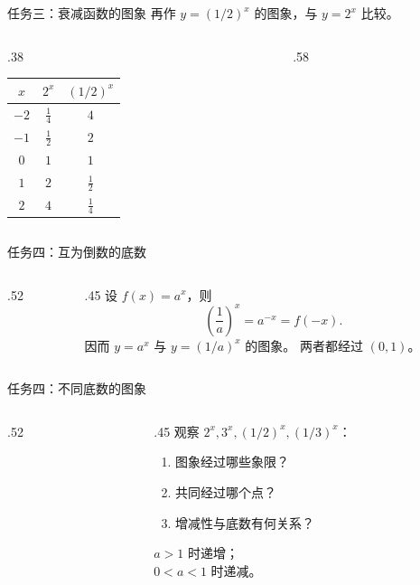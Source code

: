\documentclass[aspectratio=169,10pt]{beamer}
\begin{document}
\begin{frame}[t]{任务三：衰减函数的图象}
 再作 $y=(1/2)^x$ 的图象，与 $y=2^x$ 比较。
 \begin{columns}[T,onlytextwidth]
  \begin{column}{.38\textwidth}
   \centering\normalsize\renewcommand{\arraystretch}{1.55}
   \begin{tabular}{c|c|c}
    $x$ & $2^x$ & $(1/2)^x$\\\hline
    $-2$ & $\frac14$ & $4$\\$-1$ & $\frac12$ & $2$\\
    $0$ & $1$ & $1$\\$1$ & $2$ & $\frac12$\\$2$ & $4$ & $\frac14$
   \end{tabular}
  \end{column}
  \begin{column}{.58\textwidth}\centering\expplot\end{column}
 \end{columns}
\end{frame}

\begin{frame}[t]{任务四：互为倒数的底数}
 \begin{columns}[T,onlytextwidth]
  \begin{column}{.52\textwidth}\centering\expplot\end{column}
  \begin{column}{.45\textwidth}
   设 $f(x)=a^x$，则
   \[\left(\frac1a\right)^x=a^{-x}=f(-x).\]
   \pause
   因而 $y=a^x$ 与 $y=(1/a)^x$ 的图象。
   \gap
   两者都经过 $(0,1)$。
  \end{column}
 \end{columns}
\end{frame}

\begin{frame}[t]{任务四：不同底数的图象}
 \begin{columns}[T,onlytextwidth]
  \begin{column}{.52\textwidth}\centering\expplot[4]\end{column}
  \begin{column}{.45\textwidth}
   观察 $2^x,3^x,(1/2)^x,(1/3)^x$：
   \begin{enumerate}
    \item 图象经过哪些象限？
    \item 共同经过哪个点？
    \item 增减性与底数有何关系？
   \end{enumerate}
   \pause
   $a>1$ 时递增；\\$0<a<1$ 时递减。
  \end{column}
 \end{columns}
\end{frame}
\end{document}
